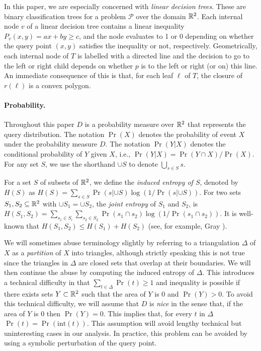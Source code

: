 \documentclass[lotsofwhite]{patmorin}
\newcommand{\interior}{\mathrm{int}}
\begin{document}
In this paper, we are especially concerned with \emph{linear decision
trees}. These are binary classification trees for a problem
$\mathcal{P}$ over the domain $\mathbb{R}^2$.  Each internal node $v$ of a
linear decision tree contains a linear inequality $P_v(x,y)=ax+by \ge
c$, and the node evaluates to 1 or 0 depending on whether the query
point $(x,y)$ satisfies the inequality or not, respectively.
Geometrically, each internal node of $T$ is labelled with a directed
line and the decision to go to the left or right child depends on
whether $p$ is to the left or right (or on) this line.  An immediate
consequence of this is that, for each leaf $\ell$ of $T$, the closure
of $r(\ell)$ is a convex polygon. 

\paragraph{Probability.}

Throughout this paper $D$ is a probability measure over $\mathbb{R}^2$ that
represents the query distribution.  The notation $\Pr(X)$ denotes the
probability of event $X$ under the probability measure $D$.  The
notation $\Pr(Y|X)$ denotes the conditional probability of $Y$ given
$X$, i.e., $\Pr(Y|X)=\Pr(Y\cap X)/\Pr(X)$.  For any set $S$, we use
the shorthand $\cup S$ to denote $\bigcup_{s\in S} s$.

For a set $S$ of subsets of $\mathbb{R}^2$, we define the \emph{induced
entropy of $S$}, denoted by $H(S)$ as $H(S)=\sum_{s\in S}\Pr(s|{\cup
S})\log(1/\Pr(s|{\cup S}))$.  For two sets $S_1,S_2\subseteq\mathbb{R}^2$ with
$\cup S_1=\cup S_2$, the \emph{joint entropy} of $S_1$ and $S_2$, is
$H(S_1,S_2) = \sum_{s_1\in S_i}\sum_{s_2\in S_2} \Pr(s_1\cap
s_2)\log(1/\Pr(s_1\cap s_2))$.  It is well-known that $H(S_1,S_2)\le
H(S_1)+H(S_2)$ (see, for example, Gray \cite[Lemma~2.3.2]{g08}).

We will sometimes abuse terminology slightly by referring to a
triangulation $\Delta$ of $X$ as a \emph{partition} of $X$ into
triangles, although strictly speaking this is not true since the
triangles in $\Delta$ are closed sets that overlap at their
boundaries.  We will then continue the abuse by computing the induced 
entropy of $\Delta$.
This introduces a technical difficulty in that
$\sum_{t\in\Delta}\Pr(t)\ge 1$ and inequality is possible if there
exists sets $Y\subset \mathbb{R}^2$ such that the area of $Y$ is 0 and
$\Pr(Y)>0$.  To avoid this technical difficulty, we will assume that
$D$ is \emph{nice} in the sense that, if the area of $Y$ is 0 then
$\Pr(Y)=0$.   This implies that, for every $t$ in $\Delta$ $\Pr(t) =
\Pr(\interior(t))$.  This assumption will avoid lengthy technical but
uninteresting cases in our analysis.  In practice, this problem can
be avoided by using a symbolic perturbation of the query point.
\end{document}
